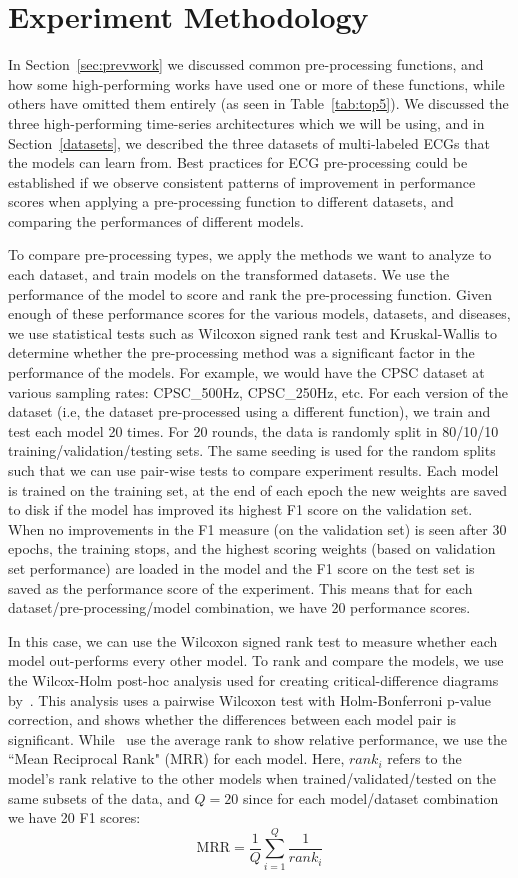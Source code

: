 \documentclass[pmlr,twocolumn]{jmlr}%
\begin{document}
\section{Experiment Methodology}
\label{sec:experiment}

In Section~\ref{sec:prevwork} we discussed common pre-processing functions, and how some high-performing works have used one or more of these functions, while others have omitted them entirely (as seen in Table~\ref{tab:top5}). We discussed the three high-performing time-series architectures which we will be using, and in Section~\ref{datasets}, we described the three datasets of multi-labeled ECGs that the models can learn from. Best practices for ECG pre-processing could be established if we observe consistent patterns of improvement in performance scores when applying a pre-processing function to different datasets, and comparing the performances of different models.

To compare pre-processing types, we apply the methods we want to analyze to each dataset, and train models on the transformed datasets. We use the performance of the model to score and rank the pre-processing function. Given enough of these performance scores for the various models, datasets, and diseases, we use statistical tests such as Wilcoxon signed rank test and Kruskal-Wallis to determine whether the pre-processing method was a significant factor in the performance of the models. For example, we would have the CPSC dataset at various sampling rates: CPSC\_500Hz, CPSC\_250Hz, etc. For each version of the dataset (i.e, the dataset pre-processed using a different function), we train and test each model 20 times. For 20 rounds, the data is randomly split in 80/10/10 training/validation/testing sets. The same seeding is used for the random splits such that we can use pair-wise tests to compare experiment results. Each model is trained on the training set, at the end of each epoch the new weights are saved to disk if the model has improved its highest F1 score on the validation set. When no improvements in the F1 measure (on the validation set) is seen after 30 epochs, the training stops, and the highest scoring weights (based on validation set performance) are loaded in the model and the F1 score on the test set is saved as the performance score of the experiment. This means that for each dataset/pre-processing/model combination, we have 20 performance scores. 

In this case, we can use the Wilcoxon signed rank test to measure whether each model out-performs every other model. To rank and compare the models, we use the Wilcox-Holm post-hoc analysis used for creating critical-difference diagrams by~\citet{IsmailFawaz2018deep}. This analysis uses a pairwise Wilcoxon test with Holm-Bonferroni p-value correction, and shows whether the differences between each model pair is significant. While~\citet{IsmailFawaz2018deep} use the average rank to show relative performance, we use the ``Mean Reciprocal Rank" (MRR) for each model. Here, $rank_i$ refers to the model's rank relative to the other models when trained/validated/tested on the same subsets of the data, and $Q=20$ since for each model/dataset combination we have 20 F1 scores:
\[ \text{MRR} = \frac{1}{Q}\sum_{i=1}^{Q}\frac{1}{rank_i} \]
\end{document}
